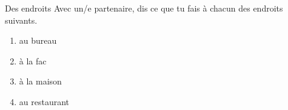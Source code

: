 \begin{frame}{Des endroits }
  Avec un/e partenaire, dis ce que tu fais à chacun des endroits suivants. \\
  \begin{enumerate}
    \item au bureau
    \item à la fac
    \item à la maison
    \item au restaurant
  \end{enumerate}
\end{frame}